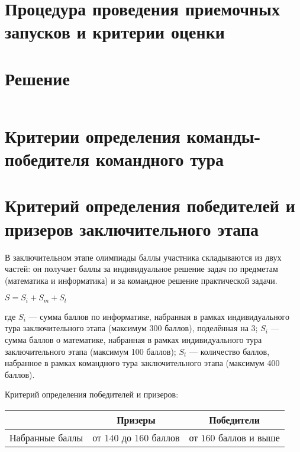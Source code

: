 \section{Процедура проведения приемочных запусков и
критерии оценки}



\section{Решение}
\inputminted[fontsize=\footnotesize, linenos]{js}{final/command_tour/irs/solution.js}

\section{Критерии определения команды-победителя командного тура}


\section{Критерий определения победителей и призеров
заключительного этапа}

В заключительном этапе олимпиады баллы участника складываются
из двух частей: он получает баллы за индивидуальное решение задач по
предметам (математика и информатика) и за командное решение
практической задачи.

\begin{center}
    $S = S_i + S_m + S_t$
\end{center}

где $S_i$ --- сумма баллов по информатике, набранная в рамках индивидуального
тура заключительного этапа (максимум 300 баллов), поделённая на 3; $S_i$ ---
сумма баллов о математике, набранная в рамках индивидуального тура
заключительного этапа (максимум 100 баллов); $S_t$ --- количество баллов,
набранное в рамках командного тура заключительного этапа (максимум
400 баллов).

Критерий определения победителей и призеров:

\begin{center}
\begin{tabular}{ |c|c|c| }
 \hline
  & \textbf{Призеры} & \textbf{Победители} \\
 \hline
 Набранные баллы & от $140$ до $160$ баллов & от $160$ баллов и выше  \\
 \hline
\end{tabular}
\end{center}


